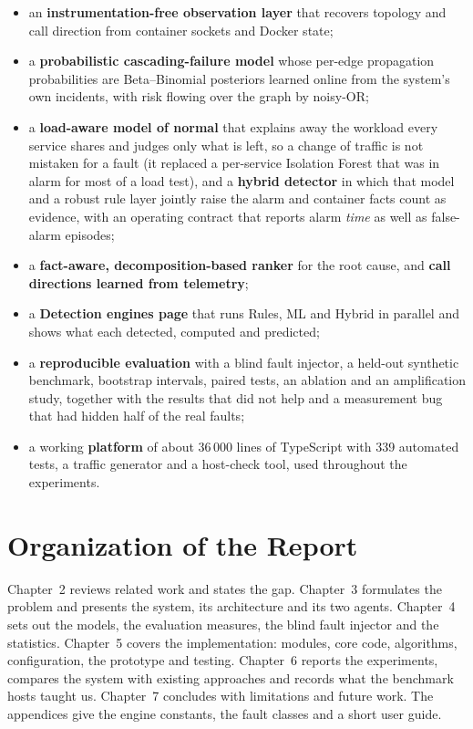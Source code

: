 \begin{itemize}
\item an \textbf{instrumentation-free observation layer} that recovers topology and call direction from container sockets and Docker state;
\item a \textbf{probabilistic cascading-failure model} whose per-edge propagation probabilities are Beta--Binomial posteriors learned online from the system's own incidents, with risk flowing over the graph by noisy-OR;
\item a \textbf{load-aware model of normal} that explains away the workload every service shares and judges only what is left, so a change of traffic is not mistaken for a fault (it replaced a per-service Isolation Forest that was in alarm for most of a load test), and a \textbf{hybrid detector} in which that model and a robust rule layer jointly raise the alarm and container facts count as evidence, with an operating contract that reports alarm \emph{time} as well as false-alarm episodes;
\item a \textbf{fact-aware, decomposition-based ranker} for the root cause, and \textbf{call directions learned from telemetry};
\item a \textbf{Detection engines page} that runs Rules, ML and Hybrid in parallel and shows what each detected, computed and predicted;
\item a \textbf{reproducible evaluation} with a blind fault injector, a held-out synthetic benchmark, bootstrap intervals, paired tests, an ablation and an amplification study, together with the results that did not help and a measurement bug that had hidden half of the real faults;
\item a working \textbf{platform} of about 36\,000 lines of TypeScript with 339 automated tests, a traffic generator and a host-check tool, used throughout the experiments.
\end{itemize}

\section{Organization of the Report}
Chapter~2 reviews related work and states the gap. Chapter~3 formulates the problem and presents the system, its architecture and its two agents. Chapter~4 sets out the models, the evaluation measures, the blind fault injector and the statistics. Chapter~5 covers the implementation: modules, core code, algorithms, configuration, the prototype and testing. Chapter~6 reports the experiments, compares the system with existing approaches and records what the benchmark hosts taught us. Chapter~7 concludes with limitations and future work. The appendices give the engine constants, the fault classes and a short user guide.
